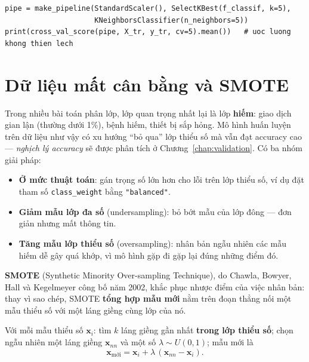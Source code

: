 \begin{lstlisting}[caption={Lựa chọn đặc trưng đúng cách: bên trong Pipeline}]
pipe = make_pipeline(StandardScaler(), SelectKBest(f_classif, k=5),
                     KNeighborsClassifier(n_neighbors=5))
print(cross_val_score(pipe, X_tr, y_tr, cv=5).mean())   # uoc luong khong thien lech
\end{lstlisting}

\section{Dữ liệu mất cân bằng và SMOTE}
\label{sec:smote}

Trong nhiều bài toán phân lớp, lớp quan trọng nhất lại là lớp \textbf{hiếm}: giao dịch gian lận (thường dưới 1\%), bệnh hiếm, thiết bị sắp hỏng. Mô hình huấn luyện trên dữ liệu như vậy có xu hướng ``bỏ qua'' lớp thiểu số mà vẫn đạt accuracy cao --- \textit{nghịch lý accuracy} sẽ được phân tích ở Chương~\ref{chap:validation}. Có ba nhóm giải pháp:
\begin{itemize}
    \item \textbf{Ở mức thuật toán}: gán trọng số lớn hơn cho lỗi trên lớp thiểu số, ví dụ đặt tham số \texttt{class\_weight} bằng \texttt{"balanced"}.
    \item \textbf{Giảm mẫu lớp đa số} (undersampling): bỏ bớt mẫu của lớp đông --- đơn giản nhưng mất thông tin.
    \item \textbf{Tăng mẫu lớp thiểu số} (oversampling): nhân bản ngẫu nhiên các mẫu hiếm dễ gây quá khớp, vì mô hình gặp đi gặp lại đúng những điểm đó.
\end{itemize}

\textbf{SMOTE} (Synthetic Minority Over-sampling Technique), do Chawla, Bowyer, Hall và Kegelmeyer công bố năm 2002, khắc phục nhược điểm của việc nhân bản: thay vì sao chép, SMOTE \textbf{tổng hợp mẫu mới} nằm trên đoạn thẳng nối một mẫu thiểu số với một láng giềng cùng lớp của nó.

\begin{definition}
Với mỗi mẫu thiểu số $\mathbf{x}_i$: tìm $k$ láng giềng gần nhất \textbf{trong lớp thiểu số}; chọn ngẫu nhiên một láng giềng $\mathbf{x}_{nn}$ và một số $\lambda \sim U(0, 1)$; mẫu mới là
\begin{equation}
    \mathbf{x}_{\text{mới}} = \mathbf{x}_i + \lambda\,(\mathbf{x}_{nn} - \mathbf{x}_i).
\end{equation}
\end{definition}

